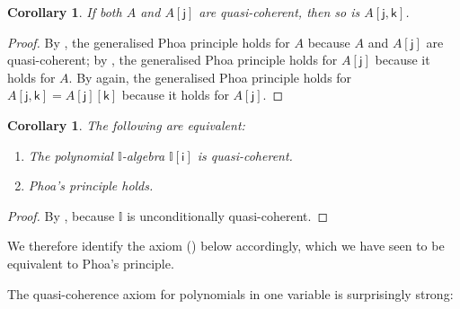 \documentclass[a4paper,12pt]{amsart}
\newtheorem{lemma}[theorem]{Lemma}
\newtheorem{corollary}[theorem]{Corollary}
\theoremstyle{definition}
\newcommand{\mbb}[1]{\mathbb{#1}}
\newcommand{\I}{\mbb I}
\newcommand{\ms}[1]{\mathsf{#1}}
\begin{document}
\begin{corollary}\label{cor:A-and-Ax-qc-to-Axy-qc}
  If both $A$ and $A[\ms{j}]$ are quasi-coherent, then so is $A[\ms{j},\ms{k}]$.
\end{corollary}
\begin{proof}
  By , the generalised Phoa principle holds for $A$ because $A$ and $A[\ms{j}]$ are quasi-coherent; by , the generalised Phoa principle holds for $A[\ms{j}]$ because it holds for $A$.  By  again, the generalised Phoa principle holds for $A[\ms{j},\ms{k}] = A[\ms{j}][\ms{k}]$ because it holds for $A[\ms{j}]$.
\end{proof}

\begin{corollary}
  The following are equivalent:
  \begin{enumerate}
    \item The polynomial $\I$-algebra $\I[\ms{i}]$ is quasi-coherent.
    \item Phoa's principle holds.
  \end{enumerate}
\end{corollary}

\begin{proof}
  By , because $\I$ is unconditionally quasi-coherent.
\end{proof}


We therefore identify the axiom (\AxiomSQCP) below accordingly, which we have seen to be equivalent to Phoa's principle.

\PrintAxiomSQCP


The quasi-coherence axiom for polynomials in one variable is surprisingly strong:


\end{document}

